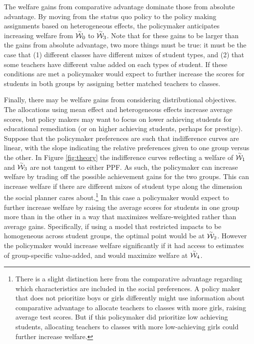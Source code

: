 \documentclass[12pt]{article}
\theoremstyle{definition}
\theoremstyle{definition}
\theoremstyle{definition}
\theoremstyle{definition}
\begin{document}
    The welfare gains from comparative advantage dominate those from absolute advantage. By moving from the status quo policy to the policy making assignments based on heterogeneous effects, the policymaker anticipates increasing welfare from $\accentset{\sim}{\mathcal{W}}_0$ to $\accentset{\sim}{\mathcal{W}}_3$. Note that for these gains to be larger than the gains from absolute advantage, two more things must be true: it must be the case that  (1) different classes have different mixes of student types, and (2) that some teachers have different value added on each types of student. If these conditions are met a policymaker would expect to further increase the scores for students in both groups by assigning better matched teachers to classes.
    
    Finally, there may be welfare gains from considering distributional objectives. The allocations using mean effect and heterogeneous effects increase average scores, but policy makers may want to focus on lower achieving students for educational remediation (or on higher achieving students, perhaps for prestige).  Suppose that the policymaker preferences are such that indifference curves are linear, with the slope indicating the relative preferences given to one group versus the other. In Figure \ref{fig:theory} the indifference curves reflecting a welfare of $\accentset{\sim}{\mathcal{W}}_1$ and $\accentset{\sim}{\mathcal{W}}_3$ are not tangent to either PPF. As such, the policymaker can increase welfare by trading off the possible achievement gains for the two groups. This can increase welfare if there are different mixes of student type along the dimension the social planner cares about.\footnote{There is a slight distinction here from the comparative advantage regarding which characteristics are included in the social preferences. A policy maker that does not prioritize boys or girls differently might use information about comparative advantage to allocate teachers to classes with more girls, raising average test scores. But if this policymaker did prioritize low achieving students, allocating teachers to classes with more low-achieving girls could further increase welfare.} In this case a policymaker would expect to further increase welfare by raising the average scores for students in one group more than in the other in a way that maximizes welfare-weighted rather than average gains. Specifically, if using a model that restricted impacts to be homogeneous across student groups, the optimal point would be at $\accentset{\sim}{\mathcal{W}}_2$. However the policymaker would increase welfare significantly if it had access to estimates of group-specific value-added, and would maximize welfare at  $\accentset{\sim}{\mathcal{W}}_4$.
    
\end{document}
